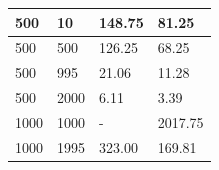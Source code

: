 \begin{table}[h!]
\begin{minipage}{.45\textwidth}
{\begin{tabular}{llll}
500  &     10  &      148.75  &  81.25 \\\hline
500  &     500  &     126.25  &  68.25 \\\hline
500  &     995  &     21.06  &   11.28 \\\hline
500  &     2000  &    6.11  &    3.39 \\\hline
1000 &   1000    &-         & 2017.75 \\ \hline
1000  &    1995  &    323.00  &  169.81 \\\hline

\end{tabular}}
\end{minipage}
\end{table}
